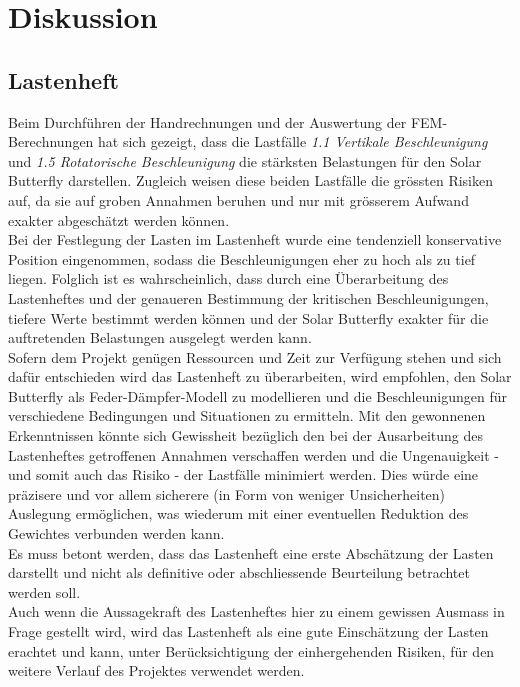 \section{Diskussion}
\label{Diskussion}

\subsection{Lastenheft}
Beim Durchführen der Handrechnungen und der Auswertung der FEM-Berechnungen hat sich gezeigt, dass die Lastfälle \emph{1.1 Vertikale Beschleunigung} und \emph{1.5 Rotatorische Beschleunigung} die stärksten Belastungen für den Solar Butterfly darstellen. Zugleich weisen diese beiden Lastfälle die grössten Risiken auf, da sie auf groben Annahmen beruhen und nur mit grösserem Aufwand exakter abgeschätzt werden können.\\
Bei der Festlegung der Lasten im Lastenheft wurde eine tendenziell konservative Position eingenommen, sodass die Beschleunigungen eher zu hoch als zu tief liegen. Folglich ist es wahrscheinlich, dass durch eine Überarbeitung des Lastenheftes und der genaueren Bestimmung der kritischen Beschleunigungen, tiefere Werte bestimmt werden können und der Solar Butterfly exakter für die auftretenden Belastungen ausgelegt werden kann.\\
Sofern dem Projekt genügen Ressourcen und Zeit zur Verfügung stehen und sich dafür entschieden wird das Lastenheft zu überarbeiten, wird empfohlen, den Solar Butterfly als Feder-Dämpfer-Modell zu modellieren und die Beschleunigungen für verschiedene Bedingungen und Situationen zu ermitteln. Mit den gewonnenen Erkenntnissen könnte sich Gewissheit bezüglich den bei der Ausarbeitung des Lastenheftes getroffenen Annahmen verschaffen werden und die Ungenauigkeit - und somit auch das Risiko - der Lastfälle minimiert werden. Dies würde eine präzisere und vor allem sicherere (in Form von weniger Unsicherheiten) Auslegung ermöglichen, was wiederum mit einer eventuellen Reduktion des Gewichtes verbunden werden kann.\\
Es muss betont werden, dass das Lastenheft eine erste Abschätzung der Lasten darstellt und nicht als definitive oder abschliessende Beurteilung betrachtet werden soll.\\
Auch wenn die Aussagekraft des Lastenheftes hier zu einem gewissen Ausmass in Frage gestellt wird, wird das Lastenheft als eine gute Einschätzung der Lasten erachtet und kann, unter Berücksichtigung der einhergehenden Risiken, für den weitere Verlauf des Projektes verwendet werden.

